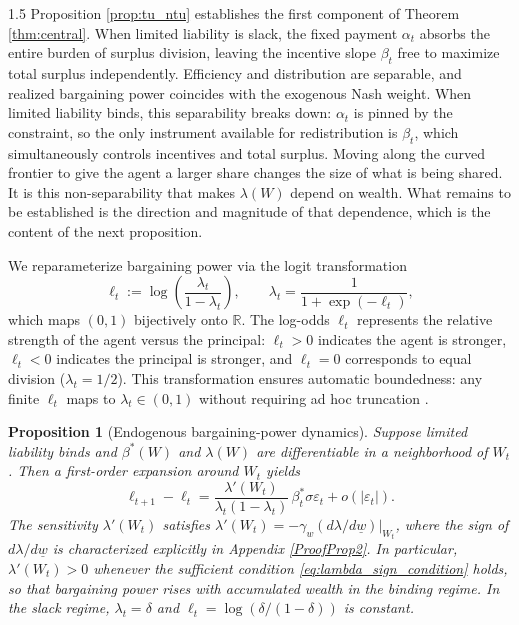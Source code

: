 \documentclass[12pt]{article}
\newtheorem{proposition}{Proposition}[section]
\theoremstyle{definition}
\theoremstyle{plain}
\begin{document}
\begin{spacing}{1.5}
Proposition \ref{prop:tu_ntu} establishes the first component of Theorem \ref{thm:central}. When limited liability is slack, the fixed payment $\alpha_t$ absorbs the entire burden of surplus division, leaving the incentive slope $\beta_t$ free to maximize total surplus independently. Efficiency and distribution are separable, and realized bargaining power coincides with the exogenous Nash weight. When limited liability binds, this separability breaks down: $\alpha_t$ is pinned by the constraint, so the only instrument available for redistribution is $\beta_t$, which simultaneously controls incentives and total surplus. Moving along the curved frontier to give the agent a larger share changes the size of what is being shared. It is this non-separability that makes $\lambda(W)$ depend on wealth. What remains to be established is the direction and magnitude of that dependence, which is the content of the next proposition.

We reparameterize bargaining power via the logit transformation
\[
\ell_t := \log\left(\frac{\lambda_t}{1-\lambda_t}\right), \qquad \lambda_t = \frac{1}{1+\exp(-\ell_t)},
\]
which maps $(0,1)$ bijectively onto $\mathbb{R}$. The log-odds $\ell_t$ represents the relative strength of the agent versus the principal: $\ell_t > 0$ indicates the agent is stronger, $\ell_t < 0$ indicates the principal is stronger, and $\ell_t = 0$ corresponds to equal division ($\lambda_t = 1/2$). This transformation ensures automatic boundedness: any finite $\ell_t$ maps to $\lambda_t \in (0,1)$ without requiring ad hoc truncation \parencite{blume1993}.

\begin{proposition}[Endogenous bargaining-power dynamics]\label{prop:dynamics}
Suppose limited liability binds and $\beta^*(W)$ and $\lambda(W)$ are differentiable in a neighborhood of $W_t$. Then a first-order expansion around $W_t$ yields
\[
\ell_{t+1}-\ell_t=\frac{\lambda'(W_t)}{\lambda_t(1-\lambda_t)}\,\beta_t^*\sigma \varepsilon_t+o(|\varepsilon_t|).
\]
The sensitivity $\lambda'(W_t)$ satisfies $\lambda'(W_t) = -\gamma_w  (d\lambda/d\underline{w})\big|_{W_t}$, where the sign of $d\lambda/d\underline{w}$ is characterized explicitly in Appendix \ref{ProofProp2}. In particular, $\lambda'(W_t) > 0$ whenever the sufficient condition \eqref{eq:lambda_sign_condition} holds, so that bargaining power rises with accumulated wealth in the binding regime. In the slack regime, $\lambda_t=\delta$ and $\ell_t=\log(\delta/(1-\delta))$ is constant.
\end{proposition}


\end{spacing}
\end{document}
